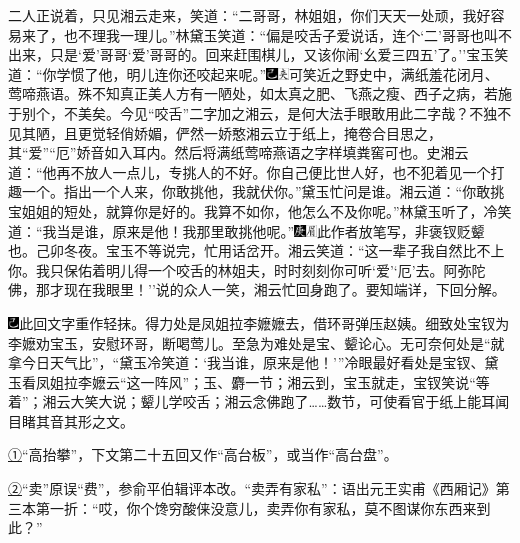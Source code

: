 二人正说着，只见湘云走来，笑道：``二哥哥，林姐姐，你们天天一处顽，我好容易来了，也不理我一理儿。''林黛玉笑道：``偏是咬舌子爱说话，连个`二'哥哥也叫不出来，只是`爱'哥哥`爱'哥哥的。回来赶围棋儿，又该你闹`幺爱三四五'了。''宝玉笑道：``你学惯了他，明儿连你还咬起来呢。''{\includegraphics[width=3mm]{../Images/00003}\includegraphics[width=3mm]{../Images/00012}\footnotesize \kaishu 可笑近之野史中，满纸羞花闭月、莺啼燕语。殊不知真正美人方有一陋处，如太真之肥、飞燕之瘦、西子之病，若施于别个，不美矣。今见``咬舌''二字加之湘云，是何大法手眼敢用此二字哉？不独不见其陋，且更觉轻俏娇媚，俨然一娇憨湘云立于纸上，掩卷合目思之，其``爱''``厄''娇音如入耳内。然后将满纸莺啼燕语之字样填粪窖可也。}史湘云道：``他再不放人一点儿，专挑人的不好。你自己便比世人好，也不犯着见一个打趣一个。指出一个人来，你敢挑他，我就伏你。''黛玉忙问是谁。湘云道：``你敢挑宝姐姐的短处，就算你是好的。我算不如你，他怎么不及你呢。''林黛玉听了，冷笑道：``我当是谁，原来是他！我那里敢挑他呢。''{\includegraphics[width=3mm]{../Images/00004}\includegraphics[width=3mm]{../Images/00010}\footnotesize \kaishu 此作者放笔写，非褒钗贬颦也。己卯冬夜。}宝玉不等说完，忙用话岔开。湘云笑道：``这一辈子我自然比不上你。我只保佑着明儿得一个咬舌的林姐夫，时时刻刻你可听`爱'`厄'去。阿弥陀佛，那才现在我眼里！''说的众人一笑，湘云忙回身跑了。要知端详，下回分解。

{\includegraphics[width=3mm]{../Images/00003}此回文字重作轻抹。得力处是凤姐拉李嬷嬷去，借环哥弹压赵姨。细致处宝钗为李嬷劝宝玉，安慰环哥，断喝莺儿。至急为难处是宝、颦论心。无可奈何处是``就拿今日天气比''，``黛玉冷笑道：`我当谁，原来是他！'''冷眼最好看处是宝钗、黛玉看凤姐拉李嬷云``这一阵风''；玉、麝一节；湘云到，宝玉就走，宝钗笑说``等着''；湘云大笑大说；颦儿学咬舌；湘云念佛跑了\ldots{}\ldots{}数节，可使看官于纸上能耳闻目睹其音其形之文。}

{\href{../Text/part0024_split_000.html\#navto_1_a}{①}``高抬攀''，下文第二十五回又作``高台板''，或当作``高台盘''。}

{\href{../Text/part0024_split_000.html\#navto_2_a}{②}``卖''原误``费''，参俞平伯辑评本改。``卖弄有家私''：语出元王实甫《西厢记》第三本第一折：``哎，你个馋穷酸俫没意儿，卖弄你有家私，莫不图谋你东西来到此？''}
